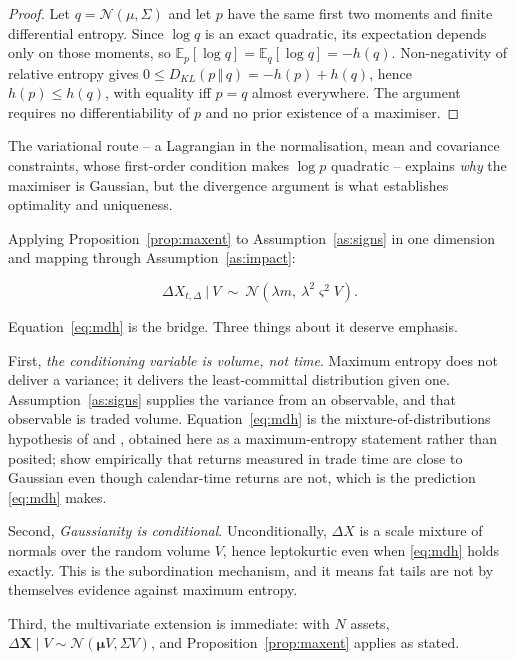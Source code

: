 \documentclass[11pt]{article}
\theoremstyle{definition}
\theoremstyle{remark}
\newcommand{\KL}[2]{D_{KL}\!\left(#1\,\Vert\,#2\right)}
\begin{document}
\begin{proof}
Let $q=\mathcal N(\mu,\Sigma)$ and let $p$ have the same first two moments and
finite differential entropy. Since $\log q$ is an exact quadratic, its
expectation depends only on those moments, so
$\mathbb{E}_p[\log q]=\mathbb{E}_q[\log q]=-h(q)$. Non-negativity of relative
entropy gives
$0\le \KL{p}{q} = -h(p)+h(q)$, hence $h(p)\le h(q)$, with equality iff $p=q$
almost everywhere. The argument requires no differentiability of $p$ and no
prior existence of a maximiser.
\end{proof}

The variational route -- a Lagrangian in the normalisation, mean and covariance
constraints, whose first-order condition makes $\log p$ quadratic -- explains
\emph{why} the maximiser is Gaussian, but the divergence argument is what
establishes optimality and uniqueness.

Applying Proposition~\ref{prop:maxent} to Assumption~\ref{as:signs} in one
dimension and mapping through Assumption~\ref{as:impact}:

\begin{equation}
\label{eq:mdh}
\Delta X_{t,\Delta}\ \big|\ V \ \sim\ \mathcal{N}\!\left(\lambda m,\ \lambda^2\varsigma^2 V\right).
\end{equation}

Equation~\eqref{eq:mdh} is the bridge. Three things about it deserve emphasis.

First, \emph{the conditioning variable is volume, not time}. Maximum entropy
does not deliver a variance; it delivers the least-committal distribution given
one. Assumption~\ref{as:signs} supplies the variance from an observable, and
that observable is traded volume. Equation~\eqref{eq:mdh} is the
mixture-of-distributions hypothesis of \citet{clark1973} and
\citet{tauchen1983}, obtained here as a maximum-entropy statement rather than
posited; \citet{ane2000} show empirically that returns measured in trade time
are close to Gaussian even though calendar-time returns are not, which is the
prediction \eqref{eq:mdh} makes.

Second, \emph{Gaussianity is conditional}. Unconditionally,
$\Delta X$ is a scale mixture of normals over the random volume $V$, hence
leptokurtic even when \eqref{eq:mdh} holds exactly. This is the
\citet{mandelbrot1967} subordination mechanism, and it means fat tails are not
by themselves evidence against maximum entropy.

Third, the multivariate extension is immediate: with $N$ assets,
$\Delta \mathbf{X}\mid V \sim \mathcal N(\boldsymbol\mu V, \Sigma V)$, and
Proposition~\ref{prop:maxent} applies as stated.
\end{document}
